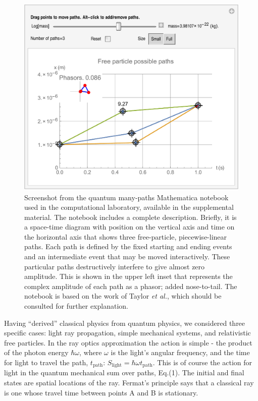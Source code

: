 \documentclass[prb,oncolumn]{revtex4-2}
\begin{document}
\begin{figure}[]
\includegraphics[width=14cm]{ActionCourseFigure.pdf}
\caption{Screenshot from the quantum many-paths Mathematica notebook used in the computational laboratory, available in the supplemental material. \cite{supplement} The notebook includes a complete description. Briefly, it is a space-time diagram with position on the vertical axis and time on the horizontal axis that shows three free-particle, piecewise-linear paths. Each path is defined by the fixed starting and ending events and an intermediate event that may be moved interactively. These particular paths destructively interfere to give almost zero amplitude. This is shown in the upper left inset that represents the complex amplitude of each path as a phasor; added nose-to-tail. The notebook is based on the work of Taylor \textit{et al.}, \cite{TaylorCIP} which should be consulted for further explanation. }
\label{destructive interference}
\end{figure}

Having ``derived'' classical physics from quantum physics, we considered three specific cases: light ray propagation, simple mechanical systems, and relativistic free particles. In the ray optics approximation the action is simple - the product of the photon energy $\hbar \omega$, where $\omega$ is the light's angular frequency, and the time for light to travel the path, $t_\textrm{path}$: $S_\textrm{light} = \hbar \omega t_\textrm{path}$. This is of course the action for light in the quantum mechanical sum over paths, Eq.(1). The initial and final states are spatial locations of the ray. Fermat's principle says that a classical ray is one whose travel time between points A and B is stationary.
\end{document}
